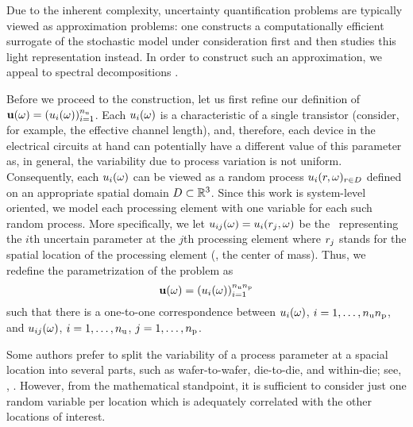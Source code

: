 Due to the inherent complexity, uncertainty quantification problems are typically viewed as approximation problems: one constructs a computationally efficient surrogate of the stochastic model under consideration first and then studies this light representation instead.
In order to construct such an approximation, we appeal to spectral decompositions \cite{maitre2010, janson1997, eldred2008}.

Before we proceed to the construction, let us first refine our definition of $\mathbf{u}(\omega) = (u_i(\omega))_{i = 1}^{n_\text{u}}$.
Each $u_i(\omega)$ is a characteristic of a single transistor (consider, for example, the effective channel length), and, therefore, each device in the electrical circuits at hand can potentially have a different value of this parameter as, in general, the variability due to process variation is not uniform.
Consequently, each $u_i(\omega)$ can be viewed as a random process $u_i(r, \omega)_{r \in D}$ defined on an appropriate spatial domain $D \subset \mathbb{R}^3$.
Since this work is system-level oriented, we model each processing element with one variable for each such random process.
More specifically, we let $u_{ij}(\omega) = u_i(r_j, \omega)$ be the \rv\ representing the $i$th uncertain parameter at the $j$th processing element where $r_j$ stands for the spatial location of the processing element (\eg, the center of mass).
Thus, we redefine the parametrization of the problem as
\begin{equation} \elab{uncertain-parameters}
  \vu(\o) = (\u_i(\o))_{i = 1}^{\nparams \nprocs}
\end{equation}
such that there is a one-to-one correspondence between $u_i(\omega)$, $i = 1, \dots, {n_\text{u}} {n_\text{p}}$, and $u_{ij}(\omega)$, $i = 1, \dots, {n_\text{u}}$, $j = 1, \dots, {n_\text{p}}$.
\begin{remark}
Some authors prefer to split the variability of a process parameter at a spacial location into several parts, such as wafer-to-wafer, die-to-die, and within-die; see, \eg, \cite{juan2012}.
However, from the mathematical standpoint, it is sufficient to consider just one random variable per location which is adequately correlated with the other locations of interest.
\end{remark}

